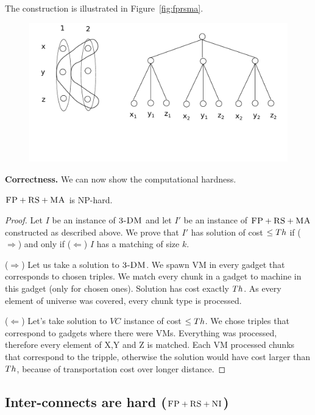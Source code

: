 The construction is illustrated in Figure~\ref{fig:fprsma}.


\begin{figure}[htbp]
\includegraphics[width = \columnwidth]{figs/example-matching}
\end{figure}



\textbf{Correctness.}
We can now show the computational hardness.
\begin{theorem}
$\textsc{FP}+\textsc{RS}+\textsc{MA}$ is NP-hard.
\end{theorem}
\begin{proof}
Let $I$ be an instance of $\textsc{3-DM}$ and let $I'$ be an instance of
$\textsc{FP}+\textsc{RS}+\textsc{MA}$ constructed as described above.
We prove that $I'$ has solution of cost $\leq Th$ if ($\Rightarrow$) and only if
($\Leftarrow$)
$I$ has a matching of size $k$.

($\Rightarrow$) Let us take a solution to $\textsc{3-DM}$. We spawn VM in every
gadget that corresponds to chosen triples. We match every chunk in a
gadget to machine in this gadget (only for chosen ones). Solution has
cost exactly $Th$. As every element of universe was covered, every
chunk type is processed.

($\Leftarrow$) Let's take solution to $VC$ instance of cost $\leq Th$. We
chose triples that correspond to gadgets where there were VMs. Everything
was processed, therefore every element of X,Y and Z is matched. Each
VM processed chunks that correspond to the tripple, otherwise the
solution would have cost larger than $Th$, because of 
transportation cost over longer distance.
\end{proof}


\subsection{Inter-connects are hard ($\textsc{FP}+\textsc{RS}+\textsc{NI}$)}\label{ssec:fprscc}


